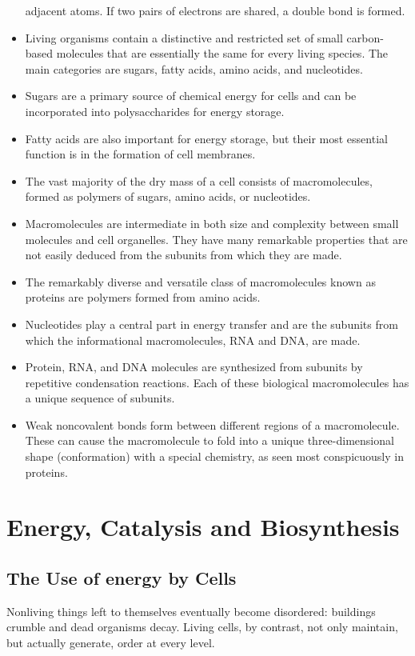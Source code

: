 \begin{itemize}
adjacent atoms. If two pairs of electrons are shared, a double bond is
formed.
\item Living organisms contain a distinctive and restricted set of small carbon-based
molecules that are essentially the same for every living
species. The main categories are sugars, fatty acids, amino acids,
and nucleotides.
\item Sugars are a primary source of chemical energy for cells and can be
incorporated into polysaccharides for energy storage.
\item Fatty acids are also important for energy storage, but their most
essential function is in the formation of cell membranes.
\item The vast majority of the dry mass of a cell consists of macromolecules,
formed as polymers of sugars, amino acids, or nucleotides.
\item Macromolecules are intermediate in both size and complexity between
small molecules and cell organelles. They have many remarkable
properties that are not easily deduced from the subunits from which
they are made.
\item The remarkably diverse and versatile class of macromolecules known
as proteins are polymers formed from amino acids.
\item Nucleotides play a central part in energy transfer and are the subunits
from which the informational macromolecules, RNA and DNA, are made.
\item Protein, RNA, and DNA molecules are synthesized from subunits by
repetitive condensation reactions. Each of these biological macromolecules
has a unique sequence of subunits.
\item Weak noncovalent bonds form between different regions of a macromolecule.
These can cause the macromolecule to fold into a unique
three-dimensional shape (conformation) with a special chemistry, as
seen most conspicuously in proteins.
\end{itemize}

\chapter{Energy, Catalysis and Biosynthesis}

\section{The Use of energy by Cells}

Nonliving things left to themselves eventually become disordered: buildings
crumble and dead organisms decay. Living cells, by contrast, not
only maintain, but actually generate, order at every level.


